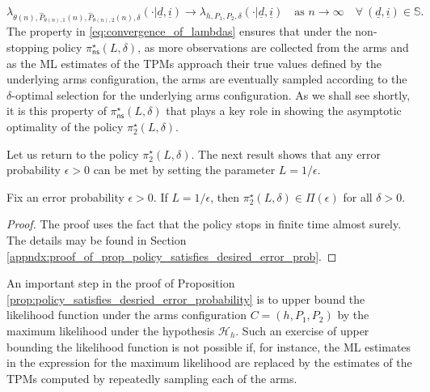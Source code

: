 \begin{equation}
 	\lambda_{\theta(n), \hat{P}_{\theta(n), 1}(n), \hat{P}_{\theta(n), 2}(n), \delta}(\cdot|\underline{d}, \underline{i})\to \lambda_{h, P_1, P_2, \delta}(\cdot|\underline{d}, \underline{i}) \quad \text{as }n\to \infty \quad \forall~(\underline{d}, \underline{i})\in \mathbb{S}.
 	\label{eq:convergence_of_lambdas_pointwise}
 \end{equation}
The property in \eqref{eq:convergence_of_lambdas} ensures that under the non-stopping policy $\pi_{\textsf{ns}}^\star(L, \delta)$, as more observations are collected from the arms and as the ML estimates of the TPMs approach their true values defined by the underlying arms configuration, the arms are eventually sampled according to the $\delta$-optimal selection for the underlying arms configuration. As we shall see shortly, it is this property of $\pi_{\textsf{ns}}^\star(L, \delta)$ that plays a key role in showing the asymptotic optimality of  the policy $\pi_2^\star(L, \delta)$.
 
Let us return to the policy $\pi_2^\star(L, \delta)$. The next result shows that any error probability $\epsilon>0$ can be met by setting the parameter $L=1/\epsilon$.
\begin{prop}
\label{prop:policy_satisfies_desried_error_probability}
	Fix an error probability $\epsilon>0$. If $L=1/\epsilon$, then $\pi_2^\star(L,\delta)\in\Pi(\epsilon)$ for all $\delta>0$.
\end{prop}
\begin{proof}
The proof uses the fact that the policy stops in finite time almost surely. The details may be found in Section \ref{appndx:proof_of_prop_policy_satisfies_desired_error_prob}.
\end{proof}
An important step in the proof of Proposition \ref{prop:policy_satisfies_desried_error_probability} is to upper bound the likelihood function under the arms configuration $C=(h, P_1, P_2)$ by the maximum likelihood under the hypothesis $\mathcal{H}_h$. Such an exercise of upper bounding the likelihood function is not possible if, for instance, the ML estimates in the expression for the maximum likelihood are replaced by the estimates of the TPMs computed by repeatedly sampling each of the arms.

